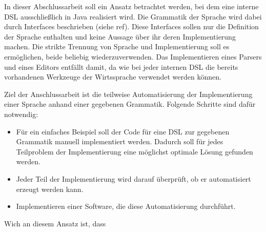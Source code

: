 In dieser Abschlussarbeit soll ein Ansatz betrachtet werden, bei dem eine interne DSL ausschließlich in Java realisiert wird. Die Grammatik der Sprache wird dabei durch Interfaces beschrieben (siehe ref). Diese Interfaces sollen nur die Definition der Sprache enthalten und keine Aussage über ihr deren Implementierung machen. Die strikte Trennung von Sprache und Implementierung soll es ermöglichen, beide beliebig wiederzuverwenden.
Das Implementieren eines Parsers und eines Editors entfällt damit, da wie bei jeder internen DSL die bereits vorhandenen Werkzeuge der Wirtssprache verwendet werden können.

Ziel der Anschlussarbeit ist die teilweise Automatisierung der Implementierung einer Sprache anhand einer gegebenen Grammatik. Folgende Schritte sind dafür notwendig:
\begin{itemize}
	\item Für ein einfaches Beispiel soll der Code für eine DSL zur gegebenen Grammatik manuell implementiert werden. Dadurch soll für jedes Teilproblem der Implementierung eine möglichst optimale Lösung gefunden werden.
	\item Jeder Teil der Implementierung wird darauf überprüft, ob er automatisiert erzeugt werden kann.
	\item Implementieren einer Software, die diese Automatisierung durchführt.
\end{itemize}

Wich an diesem Ansatz ist, dass